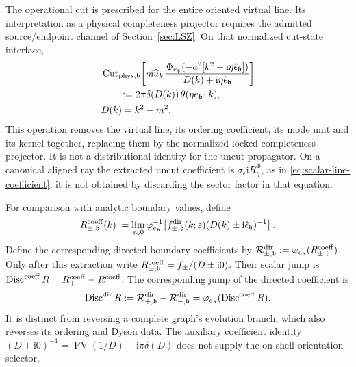 \documentclass[final,5p,times,twocolumn,numbers,nopreprintline]{elsarticle}
\numberwithin{equation}{section}
\theoremstyle{definition}
\theoremstyle{remark}
\newcommand{\ii}{\mathrm i}
\newcommand{\bb}{\mathfrak b}
\newcommand{\Ph}{\Phi}
\newcommand{\PV}{\operatorname{PV}}
\newcommand{\Disc}{\operatorname{Disc}}
\newcommand{\Cut}{\operatorname{Cut}}
\newcommand{\ee}{e_{\bb}}
\newcommand{\epsvec}{\hat\epsilon_{\bb}}
\newcommand{\embed}{\varphi_{\ee}}
\begin{document}
The operational cut is prescribed for the entire oriented virtual
line. Its interpretation as a physical completeness projector requires
the admitted source/endpoint channel of Section~\ref{sec:LSZ}. On that
normalized cut-state interface,
\begin{equation}
\begin{aligned}
 &\Cut_{{\rm phys},\bb}\!\left[
  \eta\ii\widehat u_k\,
  \frac{\Ph_{\ee}(-a^2[k^2+\ii\eta\epsvec])}
       {D(k)+\ii\eta\epsvec}\right]\\
 &\qquad:=2\pi\delta(D(k))\,\theta(\eta\ee\!\cdot k),\\
 &D(k)=k^2-m^2.
\end{aligned}
 \label{eq:physical-cut-map}
\end{equation}
This operation removes the virtual line, its ordering
coefficient, its mode unit and its kernel together, replacing them
by the normalized locked completeness projector. It is not a
distributional identity for the uncut propagator. On a canonical
aligned ray the extracted uncut coefficient is
\(\sigma_\epsilon\ii R^\Ph_\eta\), as in
\eqref{eq:scalar-line-coefficient}; it is not obtained by
discarding the sector factor in that equation.

For comparison with analytic boundary values, define
\begin{equation}
 R^{\rm coeff}_{\pm,\bb}(k)
 :=\lim_{\varepsilon\downarrow0}
       \embed^{-1}\!\left[
       f^{\rm dir}_{\pm,\bb}(k;\varepsilon)
        (D(k)\mathbin{\pm}\ii\epsvec)^{-1}\right].
 \label{eq:cut-directed-coefficient-extraction}
\end{equation}
Define the corresponding directed boundary coefficients by
\(\mathcal R^{\rm dir}_{\pm,\bb}
:=\embed(R^{\rm coeff}_{\pm,\bb})\).
Only after this extraction write
\(R^{\rm coeff}_{\pm,\bb}=f_\pm/(D\pm\ii0)\).
Their scalar jump is
\(\Disc^{\rm coeff}R=R^{\rm coeff}_+-R^{\rm coeff}_-\).
The corresponding jump of the directed coefficient is
\begin{equation}
 \Disc^{\rm dir}R
 :=\mathcal R^{\rm dir}_{+,\bb}
       -\mathcal R^{\rm dir}_{-,\bb}
 =\embed(\Disc^{\rm coeff}R).
 \label{eq:directed-discontinuity-reconstruction}
\end{equation}
It is distinct from reversing a complete graph's evolution
branch, which also reverses its ordering and Dyson data.
The auxiliary coefficient identity
\((D+\ii0)^{-1}=\PV(1/D)-\ii\pi\delta(D)\)
does not supply the on-shell orientation selector.
\end{document}

